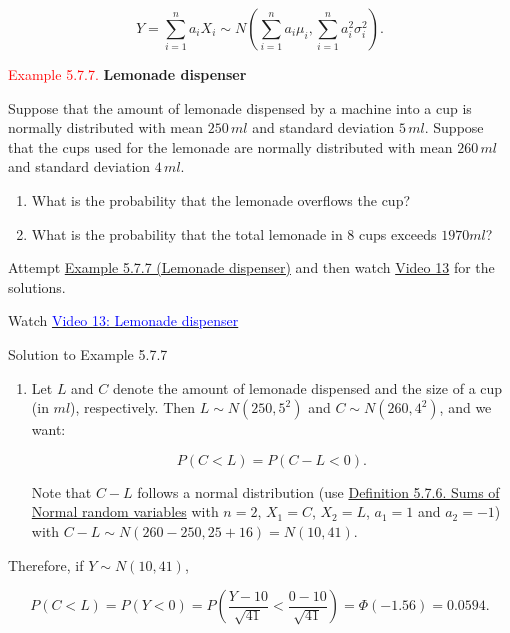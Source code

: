 \documentclass[
]{book}
\providecommand{\tightlist}{%
  \setlength{\itemsep}{0pt}\setlength{\parskip}{0pt}}
\begin{document}
\[ Y = \sum_{i=1}^n a_i X_i \sim N \left( \sum_{i=1}^n a_i \mu_i, \sum_{i=1}^n a_i^2 \sigma_i^2 \right).\]

\hfill\break

\leavevmode{}%
\textcolor{red}{Example 5.7.7.}
{\textbf{Lemonade dispenser}}

Suppose that the amount of lemonade dispensed by a machine into a cup is
normally distributed with mean \(250 \, ml\) and standard deviation \(5\, ml\). Suppose that the cups used for the lemonade are normally
distributed with mean \(260 \, ml\) and standard deviation \(4 \, ml\).

\begin{enumerate}
\def\labelenumi{(\alph{enumi})}
\tightlist
\item
  What is the probability that the lemonade overflows the cup?\\
\item
  What is the probability that the total lemonade in 8 cups exceeds \(1970 ml\)?\\
\end{enumerate}

Attempt \protect\hyperlink{rv:exer:lemonade}{Example 5.7.7 (Lemonade dispenser)} and then watch \protect\hyperlink{video13}{Video 13} for the solutions.

Watch \href{https://mediaspace.nottingham.ac.uk/media/Lemonade+Example+FINAL+VERSION/1_prbx0h86}{\textcolor{blue}{Video 13: Lemonade dispenser}}

Solution to Example 5.7.7

\begin{enumerate}
\def\labelenumi{(\alph{enumi})}
\tightlist
\item
  Let \(L\) and \(C\) denote the amount of lemonade dispensed and the size of a cup (in \(ml\)), respectively. Then \(L \sim N(250,5^2)\) and \(C \sim N(260,4^2)\), and we want:

  \[ P(C <L) = P(C-L <0).\]

  Note that \(C-L\) follows a normal distribution (use \protect\hyperlink{rv:def:normal_sums}{Definition 5.7.6. Sums of Normal random variables} with \(n=2\), \(X_1 =C\), \(X_2=L\), \(a_1 =1\) and \(a_2 =-1\)) with \(C-L \sim N(260-250,25+16) = N(10,41)\).
\end{enumerate}

Therefore, if \(Y \sim N(10,41)\),

\[ P(C<L) = P(Y <0) = P \left( \frac{Y-10}{\sqrt{41}} < \frac{0-10}{\sqrt{41}} \right) = \Phi \left(-1.56 \right) = 0.0594.\]
\end{document}
